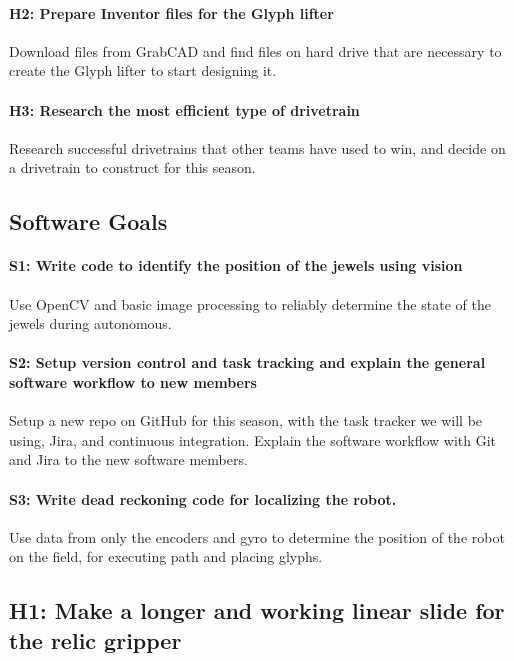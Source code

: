 \documentclass{article}
\begin{document}
\paragraph{H2: Prepare Inventor files for the Glyph lifter}
Download files from GrabCAD and find files on hard drive that are necessary to create the Glyph lifter to start designing it.
\paragraph{H3: Research the most efficient type of drivetrain}
Research successful drivetrains that other teams have used to win, and decide on a drivetrain to construct for this season.
\subsection{Software Goals}
\paragraph{S1: Write code to identify the position of the jewels using vision}
Use OpenCV and basic image processing to reliably determine the state of the jewels during autonomous.
\paragraph{S2: Setup version control and task tracking and explain the general software workflow to new members}
Setup a new repo on GitHub for this season, with the task tracker we will be using, Jira, and continuous integration. Explain the software workflow with Git and Jira to the new software members.
\paragraph{S3: Write dead reckoning code for localizing the robot.}
Use data from only the encoders and gyro to determine the position of the robot on the field, for executing path and placing glyphs.
\newpage
\subsection{H1: Make a longer and working linear slide for the relic gripper}
\end{document}
